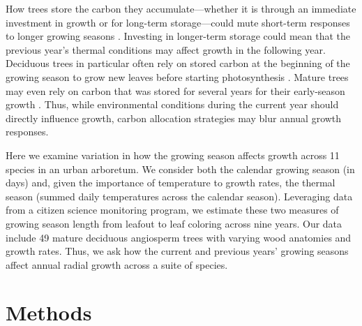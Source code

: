 \documentclass{article}\usepackage[]{graphicx}\usepackage[]{xcolor}
\begin{document}
How trees store the carbon they accumulate---whether it is through an immediate investment in growth or for long-term storage---could mute short-term responses to longer growing seasons \citep{hesslCarbonUptakeStorage2026}. Investing in longer-term storage could mean that the previous year's thermal conditions may affect growth in the following year. Deciduous trees in particular often rely on stored carbon at the beginning of the growing season to grow new leaves before starting photosynthesis \citep{zweifel_intraannual_2006,monson_finding_2018,wolkovich_why_2025}. Mature trees may even rely on carbon that was stored for several years for their early-season growth \citep{hesslCarbonUptakeStorage2026}. Thus, while environmental conditions during the current year should directly influence growth, carbon allocation strategies may blur annual growth responses. 

Here we examine variation in how the growing season affects growth across 11 species in an urban arboretum. We consider both the calendar growing season (in days) and, given the importance of temperature to growth rates, the thermal season (summed daily temperatures across the calendar season). Leveraging data from a citizen science monitoring program, we estimate these two measures of growing season length from leafout to leaf coloring across nine years. Our data include 49 mature deciduous angiosperm trees with varying wood anatomies and growth rates. Thus, we ask how the current and previous years' growing seasons affect annual radial growth across a suite of species.

\section{Methods} 

\end{document}

